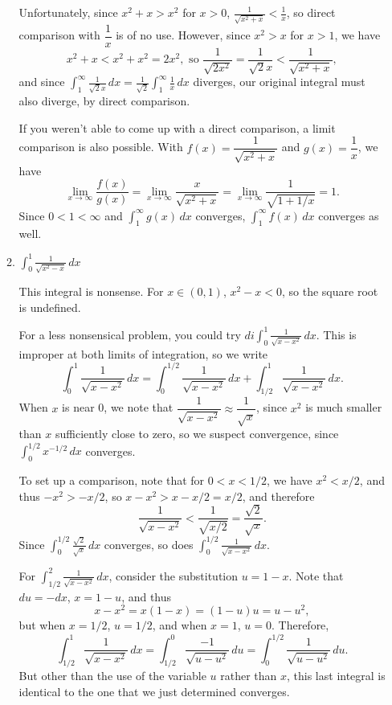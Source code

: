 \documentclass[12pt]{article}
\newcommand{\di}{\displaystyle}
\begin{document}
\begin{enumerate}
\begin{enumerate}
Unfortunately, since $x^2+x>x^2$ for $x>0$, $\frac{1}{\sqrt{x^2+x}}<\frac{1}{x}$, so direct comparison with $\dfrac{1}{x}$ is of no use. However, since $x^2>x$ for $x>1$, we have
\[
x^2+x<x^2+x^2=2x^2, \text{ so } \frac{1}{\sqrt{2x^2}}=\frac{1}{\sqrt{2}x}<\frac{1}{\sqrt{x^2+x}},
\]
and since $\di \int_1^\infty\frac{1}{\sqrt{2}x}\,dx = \frac{1}{\sqrt{2}}\int_1^\infty\frac{1}{x}\,dx$ diverges, our original integral must also diverge, by direct comparison.

If you weren't able to come up with a direct comparison, a limit comparison is also possible. With $f(x) = \dfrac{1}{\sqrt{x^2+x}}$ and $g(x) = \dfrac{1}{x}$, we have
\[
\lim_{x\to\infty}\frac{f(x)}{g(x)} = \lim_{x\to\infty}\frac{x}{\sqrt{x^2+x}} = \lim_{x\to\infty}\frac{1}{\sqrt{1+1/x}}=1.
\]
Since $0<1<\infty$ and $\int_1^\infty g(x)\,dx$ converges, $\int_1^\infty f(x)\,dx$ converges as well.

\item $\di \int_0^1\frac{1}{\sqrt{x^2-x}}\,dx$

This integral is nonsense. For $x\in (0,1)$, $x^2-x<0$, so the square root is undefined.

For a less nonsensical problem, you could try $di\int_0^1\frac{1}{\sqrt{x-x^2}}\,dx$. This is improper at both limits of integration, so we write
\[
\int_0^1\frac{1}{\sqrt{x-x^2}}\,dx = \int_0^{1/2}\frac{1}{\sqrt{x-x^2}}\,dx+\int_{1/2}^1\frac{1}{\sqrt{x-x^2}}\,dx.
\]
When $x$ is near 0, we note that $\dfrac{1}{\sqrt{x-x^2}}\approx\dfrac{1}{\sqrt{x}}$, since $x^2$ is much smaller than $x$ sufficiently close to zero, so we suspect convergence, since $\int_0^{1/2}x^{-1/2}\,dx$ converges.

To set up a comparison, note that for $0<x<1/2$, we have $x^2<x/2$, and thus $-x^2>-x/2$, so $x-x^2>x-x/2=x/2$, and therefore
\[
\frac{1}{\sqrt{x-x^2}}<\frac{1}{\sqrt{x/2}}=\frac{\sqrt{2}}{\sqrt{x}}.
\]
Since $\di \int_0^{1/2}\frac{\sqrt{2}}{\sqrt{x}}\,dx$ converges, so does $\di \int_0^{1/2}\frac{1}{\sqrt{x-x^2}}\,dx$.

For $\di\int_{1/2}^2\frac{1}{\sqrt{x-x^2}}\,dx$, consider the substitution $u=1-x$. Note that $du=-dx$, $x=1-u$, and thus
\[
x-x^2 = x(1-x)=(1-u)u=u-u^2,
\]
but when $x=1/2$, $u=1/2$, and when $x=1$, $u=0$. Therefore,
\[
\int_{1/2}^1\frac{1}{\sqrt{x-x^2}}\,dx = \int_{1/2}^0\frac{-1}{\sqrt{u-u^2}}\,du = \int_0^{1/2}\frac{1}{\sqrt{u-u^2}}\,du.
\]
But other than the use of the variable $u$ rather than $x$, this last integral is identical to the one that we just determined converges.


\end{enumerate}
\end{enumerate}
\end{document}

